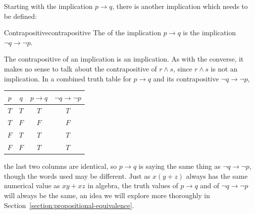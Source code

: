 \documentclass{book}
\theoremstyle{ekimcustom}
\newcommand\defn[1]{{\color{blue}{\bf #1}}}
\begin{document}
Starting with the implication $p \to q$, there is another implication which needs to be defined:
\begin{bdefinition}{Contrapositive}{contrapositive}
The \defn{contrapositive} of the implication $p \rightarrow q$ is the implication $\neg q \rightarrow \neg p$.
\end{bdefinition}
The contrapositive of an implication is an implication. As with the converse, it makes no sense to talk about the contrapositive of $r \wedge s$, since $r \wedge s$ is not an implication. In a combined truth table for $p \rightarrow q$ and its contrapositive $\neg q \rightarrow \neg p$,
\begin{center}
\begin{tabular}{c|c||c|c}
$p$ & $q$ & $p \rightarrow q$ & $\neg q \rightarrow \neg p$ \\\hline
$T$ & $T$ & $T$ & $T$\\
$T$ & $F$ & $F$ & $F$ \\
$F$ & $T$ & $T$ & $T$ \\
$F$ & $F$ & $T$ & $T$
\end{tabular}
\end{center}
the last two columns are identical, so $p \rightarrow q$ is saying the same thing as $\neg q \rightarrow \neg p$, though the words used may be different. Just as $x(y+z)$ always has the same numerical value as $xy+xz$ in algebra, the truth values of $p \rightarrow q$ and of $\neg q \rightarrow \neg p$ will always be the same, an idea we will explore more thoroughly in Section~\ref{section:propositional-equivalence}.
\end{document}
